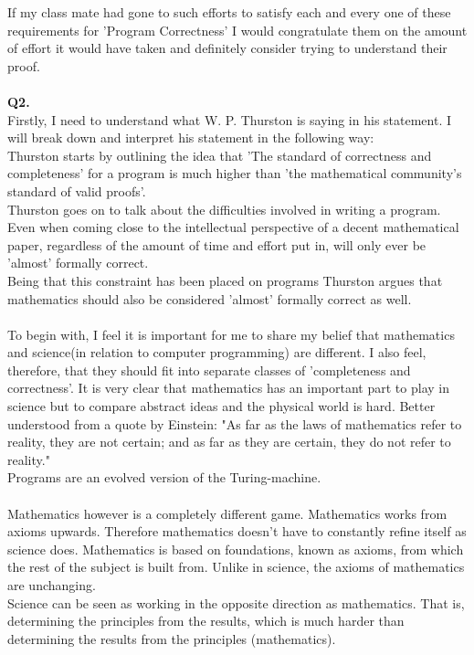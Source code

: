 \documentclass[a4paper,12pt]{article}
\begin{document}
If my class mate had gone to such efforts to satisfy each and every one of these requirements for 'Program Correctness' I would congratulate them on the amount of effort it would have taken and definitely consider trying to understand their proof.\\
\\
\noindent \textbf{Q2.} \\
Firstly, I need to understand what W. P. Thurston is saying in his statement. I will break down and interpret his statement in the following way: \\
Thurston starts by outlining the idea that 'The standard of correctness and completeness' for a program is much higher than 'the mathematical community's standard of valid proofs'.\\
Thurston goes on to talk about the difficulties involved in writing a program. Even when coming close to the intellectual perspective of a decent mathematical paper, regardless of the amount of time and effort put in, will only ever be 'almost' formally correct. \\
Being that this constraint has been placed on programs Thurston argues that mathematics should also be considered 'almost' formally correct as well. \\
\\
To begin with, I feel it is important for me to share my belief that mathematics and science(in relation to computer programming) are different. I also feel, therefore, that they should fit into separate classes of 'completeness and correctness'. It is very clear that mathematics has an important part to play in science but to compare abstract ideas and the physical world is hard. Better understood from a quote by Einstein: "As far as the laws of mathematics refer to reality, they are not certain; and as far as they are certain, they do not refer to reality."\\
Programs are an evolved version of the Turing-machine.  \\
\\
Mathematics however is a completely different game. Mathematics works from axioms upwards. Therefore mathematics doesn't have to constantly refine itself as science does. Mathematics is based on foundations, known as axioms, from which the rest of the subject is built from. Unlike in science, the axioms of mathematics are unchanging. \\
Science can be seen as working in the opposite direction as mathematics. That is, determining the principles from the results, which is much harder than determining the results from the principles (mathematics).\\
\end{document}
